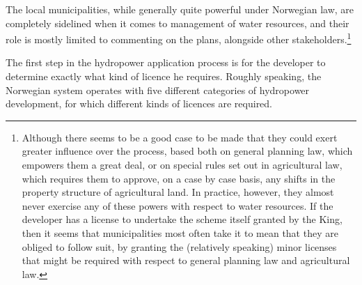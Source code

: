 The local municipalities, while generally quite powerful under Norwegian law, are completely sidelined when it comes to management of water resources, and their role is mostly limited to commenting on the plans, alongside other stakeholders.\footnote{Although there seems to be a good case to be made that they could exert greater influence over the process, based both on general planning law, which empowers them a great deal, or on special rules set out in agricultural law, which requires them to approve, on a case by case basis, any shifts in the property structure of agricultural land. In practice, however, they almost never exercise any of these powers with respect to water resources. If the developer has a license to undertake the scheme itself granted by the King, then it seems that municipalities most often take it to mean that they are obliged to follow suit, by granting the (relatively speaking) minor licenses that might be required with respect to general planning law and agricultural law.}

The first step in the hydropower application process is for the developer to determine exactly what kind of licence he requires. Roughly speaking, the Norwegian system operates with five different categories of hydropower development, for which different kinds of licences are required.

